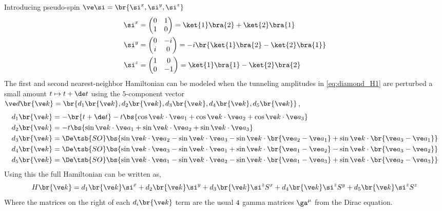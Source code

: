 \documentclass{article}
\begin{document}
Introducing pseudo-spin $\ve \si = \br{\si^x, \si^{y}, \si^{z}}$
\begin{align*}
\begin{split}
\si^x &= \begin{pmatrix} 0 & 1 \\ 1 & 0 \end{pmatrix} = \ket{1} \bra{2} + \ket{2} \bra{1} \\
\si^y &= \begin{pmatrix} 0 & -i \\ i & 0 \end{pmatrix} = -i\br{\ket{1} \bra{2} - \ket{2} \bra{1}} \\
\si^z &= \begin{pmatrix} 1 & 0 \\ 0 & -1 \end{pmatrix} = \ket{1} \bra{1} - \ket{2} \bra{2}
\end{split}
\end{align*}
The first and second nearest-neighbor Hamiltonian can be modeled when the tunneling amplitudes in \cref{eq:diamond_H1} are perturbed a small amount $t \mapsto t + \de t$ using the $5$-component vector $\ve d\br{\ve k} = \br{d_1\br{\ve k},d_2\br{\ve k},d_3\br{\ve k},d_4\br{\ve k},d_5\br{\ve k}}$,
\begin{align*}
    d_1\br{\ve k} &= - \br{t + \de t} - t \bs{\cos \ve k \cdot \ve a_1 + \cos \ve k \cdot \ve a_2 + \cos \ve k \cdot \ve a_3} \\
    d_2\br{\ve k} &= - t \bs{\sin \ve k \cdot \ve a_1 + \sin \ve k \cdot \ve a_2 + \sin \ve k \cdot \ve a_3} \\
    d_3\br{\ve k} &= \De\tsb{SO} \bs{\sin \ve k \cdot \ve a_2 - \sin \ve k \cdot \ve a_3 - \sin \ve k \cdot \br{\ve a_2 - \ve a_1} + \sin \ve k \cdot \br{\ve a_3 - \ve a_1}} \\
    d_4\br{\ve k} &= \De\tsb{SO} \bs{\sin \ve k \cdot \ve a_3 - \sin \ve k \cdot \ve a_1 + \sin \ve k \cdot \br{\ve a_1 - \ve a_2} - \sin \ve k \cdot \br{\ve a_3 - \ve a_2}} \\
    d_5\br{\ve k} &= \De\tsb{SO} \bs{\sin \ve k \cdot \ve a_1 - \sin \ve k \cdot \ve a_2 - \sin \ve k \cdot \br{\ve a_1 - \ve a_3} + \sin \ve k \cdot \br{\ve a_2 - \ve a_3}}
\end{align*}
Using this the full Hamiltonian can be written as,
\[ H\br{\ve k} = d_1\br{\ve k} \si^x + d_2\br{\ve k}  \si^y  + d_3\br{\ve k} \si^{z}S^x + d_4\br{\ve k} \si^z S^y + d_5\br{\ve k}\si^zS^z \]
Where the matrices on the right of each $d_i\br{\ve k}$ term are the usual $4 \time 4$ gamma matrices $\ga^{\mu}$ from the Dirac equation.
\end{document}
